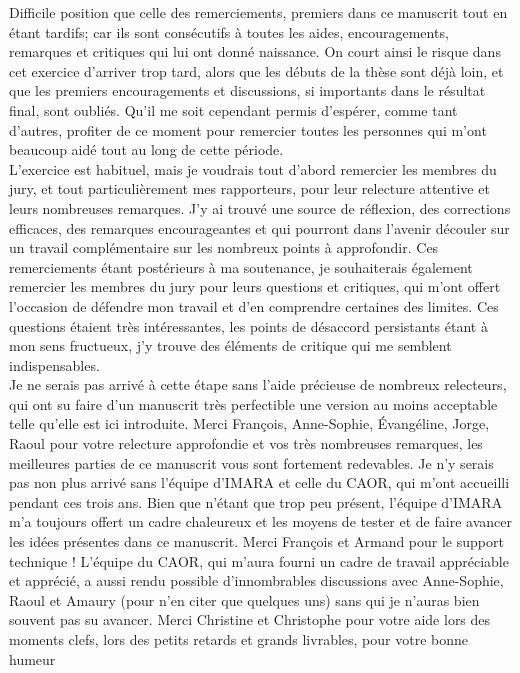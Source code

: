 Difficile position que celle des remerciements, premiers dans ce manuscrit tout en étant tardifs; car ils sont consécutifs à toutes les aides, encouragements, remarques et critiques qui lui ont donné naissance. On court ainsi le risque dans cet exercice d'arriver trop tard, alors que les débuts de la thèse sont déjà loin, et que les premiers encouragements et discussions, si importants dans le résultat final, sont oubliés. Qu'il me soit cependant permis d'espérer, comme tant d'autres, profiter de ce moment pour remercier toutes les personnes qui m'ont beaucoup aidé tout au long de cette période.\\
L'exercice est habituel, mais je voudrais tout d'abord remercier les membres du jury, et tout particulièrement mes rapporteurs, pour leur relecture attentive et leurs nombreuses remarques. J'y ai trouvé une source de réflexion, des corrections efficaces, des remarques encourageantes et qui pourront dans l'avenir découler sur un travail complémentaire sur les nombreux points à approfondir. Ces remerciements étant postérieurs à ma soutenance, je souhaiterais également remercier les membres du jury pour leurs questions et critiques, qui m'ont offert l'occasion de défendre mon travail et d'en comprendre certaines des limites. Ces questions étaient très intéressantes, les points de désaccord persistants étant à mon sens fructueux, j'y trouve des éléments de critique qui me semblent indispensables.\\

Je ne serais pas arrivé à cette étape sans l'aide précieuse de nombreux relecteurs, qui ont su faire d'un manuscrit très perfectible une version au moins acceptable telle qu'elle est ici introduite. Merci François, Anne-Sophie, Évangéline, Jorge, Raoul pour votre relecture approfondie et vos très nombreuses remarques, les meilleures parties de ce manuscrit vous sont fortement redevables. Je n'y serais pas non plus arrivé sans l'équipe d'IMARA et celle du CAOR, qui m'ont accueilli pendant ces trois ans. Bien que n'étant que trop peu présent, l'équipe d'IMARA m'a toujours offert un cadre chaleureux et les moyens de tester et de faire avancer les idées présentes dans ce manuscrit. Merci François et Armand pour le support technique ! L'équipe du CAOR, qui m'aura fourni un cadre de travail appréciable et apprécié, a aussi rendu possible d'innombrables discussions avec Anne-Sophie, Raoul et Amaury (pour n'en citer que quelques uns) sans qui je n'auras bien souvent pas su avancer. Merci Christine et Christophe pour votre aide lors des moments clefs, lors des petits retards et grands livrables, pour votre bonne humeur\\

